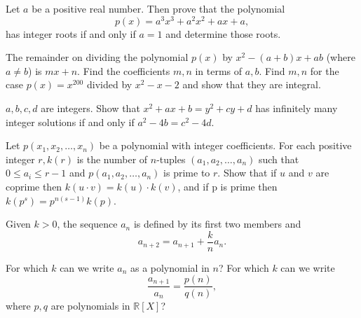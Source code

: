 \begin{question}[name={1998 Germany}]
    Let $a$ be a positive real number. Then prove that the polynomial
    \[ p(x)=a^3x^3+a^2x^2+ax+a, \]
    has integer roots if and only if $a=1$ and determine those roots.
\end{question}


\begin{question}[name={1979 Brazil}]
    The remainder on dividing the polynomial $p(x)$ by $x^2 - (a+b)x + ab$ (where $a \not = b$) is $mx + n$. Find the coefficients $m, n$ in terms of $a, b$. Find $m, n$ for the case $p(x) = x^{200}$ divided by $x^2 - x - 2$ and show that they are integral.
\end{question}



\begin{question}[name={1985 Brazil}]
    $a, b, c, d$ are integers. Show that $x^2 + ax + b = y^2 + cy + d$ has infinitely many integer solutions if and only if $a^2 - 4b = c^2 - 4d$.
\end{question}

\begin{question}[name={1987 Brazil}]
    Let $p(x_1, x_2, \dots , x_n)$ be a polynomial with integer coefficients. For each positive integer $r, k(r)$ is the number of $n$-tuples $(a_1, a_2,\dots , a_n)$ such that $0 \le a_i  \le r-1 $ and $p(a_1, a_2, \dots , a_n)$ is prime to $r$. Show that if $u$ and $v$ are coprime then $k(u\cdot v) = k(u)\cdot  k(v)$, and if p is prime then $k(p^s) = p^{n(s-1)} k(p)$.
\end{question}


\begin{question}[name={1991 Brazil}]
    Given $k > 0$, the sequence $a_n$ is defined by its first two members and \[ a_{n+2} = a_{n+1} + \frac{k}{n}a_n.\]
    \begin{tasks}
        \task For which $k$ can we write $a_n$ as a polynomial in $n$?
        \task For which $k$ can we write \[\frac{a_{n+1}}{a_n} = \frac{p(n)}{q(n)},\] where $p,q$ are polynomials in $\mathbb R[X]$?
    \end{tasks}
\end{question}


